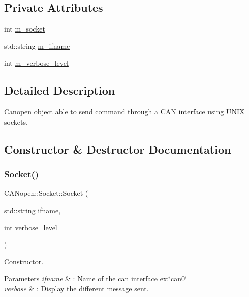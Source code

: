 \subsection*{Private Attributes}
\begin{DoxyCompactItemize}
\item 
int \hyperlink{class_c_a_nopen_1_1_socket_a39635df87fb1755fb9c2ce3d7ad6b6e3}{m\+\_\+socket}
\item 
std\+::string \hyperlink{class_c_a_nopen_1_1_socket_ae4954058b8e521b52a26065924cbea2b}{m\+\_\+ifname}
\item 
int \hyperlink{class_c_a_nopen_1_1_socket_a4911481144bf02f1dacfa74563ed8eab}{m\+\_\+verbose\+\_\+level}
\end{DoxyCompactItemize}


\subsection{Detailed Description}
Canopen object able to send command through a C\+AN interface using U\+N\+IX sockets. 

\subsection{Constructor \& Destructor Documentation}
\mbox{\label{class_c_a_nopen_1_1_socket_a66c37f6819a5ad8829326380812446e6}} 
\subsubsection{\texorpdfstring{Socket()}{Socket()}\hspace{0.1cm}{\footnotesize\ttfamily [1/2]}}
{\footnotesize\ttfamily C\+A\+Nopen\+::\+Socket\+::\+Socket (\begin{DoxyParamCaption}\item[{std\+::string}]{ifname,  }\item[{int}]{verbose\+\_\+level = {} }\end{DoxyParamCaption})}



Constructor. 


\begin{DoxyParams}{Parameters}
{\em ifname} & \+: Name of the can interface ex\+:\char`\"{}can0\char`\"{} \\
\hline
{\em verbose} & \+: Display the different message sent. \\
\hline
\end{DoxyParams}


